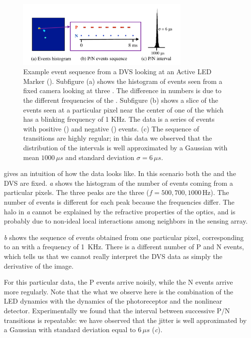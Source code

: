 \begin{figure}[b]
\begin{centering}
\includegraphics[width=8.6cm]{figures/slides/event_sequence}
\par\end{centering}

\caption{\label{fig:events-hist}Example event sequence from a DVS looking
at an Active LED Marker (\ALM). Subfigure (a) shows the histogram
of events seen from a fixed camera looking at three \ALMs. The difference
in numbers is due to the different frequencies of the \ALMs. Subfigure
(b) shows a slice of the events seen at a particular pixel near the
center of one of the \ALMs which has a blinking frequency of 1 KHz.
The data is a series of events with positive (\pP) and negative (\pN)
events. (c) The sequence of \pPN transitions are highly regular;
in this data we observed that the distribution of the intervals is
well approximated by a Gaussian with mean $1000\,\mu s$ and standard
deviation $\sigma=6\,\mu s$. }
\end{figure}


 gives an intuition of how the data looks
like. In this scenario both the \ALMs and the DVS are fixed. \emph{a}
shows the histogram of the number of events coming from a particular
pixels. The three peaks are the three \ALMs ($f=500,700,1000\,\mbox{Hz}$).
The number of events is different for each peak because the frequencies
differ. The halo in \emph{a} cannot be
explained by the refractive properties of the optics, and is probably
due to non-ideal local interactions among neighbors in the sensing
array.

\emph{b} shows the sequence of events
obtained from one particular pixel, corresponding to an \ALM  with
a frequency of 1~KHz. There is a different number of P and N events,
which tells us that we cannot really interpret the DVS data as simply
the derivative of the image. 

For this particular data, the P events arrive noisily, while the N
events arrive more regularly. Note that the what we observe here is
the combination of the LED dynamics with the dynamics of the photoreceptor
and the nonlinear detector. Experimentally we found that the interval
between successive P/N transitions is repeatable: we have observed
that the jitter is well approximated by a Gaussian with standard deviation
equal to $6\,\mu s$ (\emph{c}).



